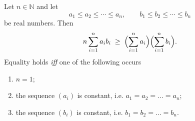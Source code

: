 \begin{theorem}
Let \(n\in\mathbb{N}\) and let  
\[
a_{1}\le a_{2}\le\cdots\le a_{n},\qquad 
b_{1}\le b_{2}\le\cdots\le b_{n}
\]
be real numbers. Then  
\begin{align}
n\sum_{i=1}^{n}a_{i}b_{i}\;\ge\;
\Bigl(\sum_{i=1}^{n}a_{i}\Bigr)\Bigl(\sum_{i=1}^{n}b_{i}\Bigr).
\end{align}
Equality holds \emph{iff} one of the following occurs
\begin{enumerate}
\item \(n=1\);
\item the sequence \((a_i)\) is constant, i.e. \(a_{1}=a_{2}= \dots =a_{n}\);
\item the sequence \((b_i)\) is constant, i.e. \(b_{1}=b_{2}= \dots =b_{n}\).
\end{enumerate}
\end{theorem}

